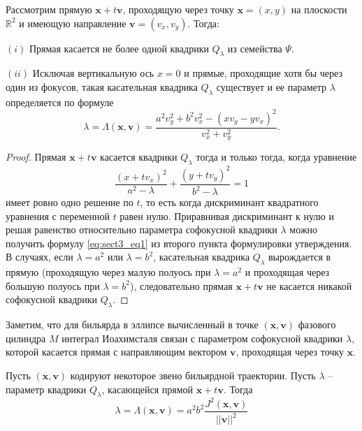\begin{statement}
Рассмотрим прямую $\mathbf{x}+t\mathbf{v}$, проходящую через точку $\mathbf{x}= (x, y)$ на плоскости $\mathbb{R}^2$ и имеющую направление $\mathbf{v}=(v_x, v_y)$. Тогда:

$(i)$ Прямая касается не более одной квадрики $Q_\lambda$ из семейства $\Psi$.

$(ii)$ Исключая вертикальную ось $x=0$ и прямые, проходящие хотя бы через один из фокусов,  такая касательная квадрика  $Q_\lambda$ существует и ее параметр $\lambda$ определяется по формуле 
\begin{equation}
\lambda = \Lambda(\mathbf{x}, \mathbf{v}) = \frac{a^2 v_y^2 + b^2v_x^2 - (x v_y-y v_x)^2}{v_x^2 + v_y^2}.
\label{eq:sect3_eq1}
\end{equation}

\end{statement}

\begin{proof}
Прямая $\mathbf{x} + t \mathbf{v}$ касается квадрики $Q_\lambda$ тогда и только тогда, когда уравнение
$$\frac{(x + t v_x)^2}{a^2-\lambda} + \frac{(y + t v_y)^2}{b^2-\lambda} = 1$$
имеет ровно одно решение по $t$, то есть когда дискриминант квадратного уравнения с переменной $t$  равен нулю. Приравнивая дискриминант к нулю и решая равенство относительно параметра софокусной квадрики $\lambda$ можно получить формулу \eqref{eq:sect3_eq1} из второго пункта формулировки утверждения. В случаях, если $\lambda = a^2$ или $\lambda = b^2$, касательная квадрика $Q_\lambda$ вырождается в прямую (проходящую через малую полуось при $\lambda = a^2$ и проходящая через большую полуось при $\lambda = b^2$), следовательно прямая $\mathbf{x}+ t\mathbf{v}$ не касается никакой софокусной квадрики $Q_\lambda$.
\end{proof}

Заметим, что для бильярда в эллипсе вычисленный в точке $(\mathbf{x}, \mathbf{v})$ фазового цилиндра $M$ интеграл Иоахимсталя связан с параметром софокусной квадрики $\lambda$, которой касается прямая с направляющим вектором $\mathbf{v}$, проходящая через точку $\mathbf{x}$.

\begin{statement}
    Пусть $(\mathbf{x}, \mathbf{v})$ кодируют некоторое звено бильярдной траектории. Пусть $\lambda$ -- параметр квадрики $Q_\lambda$, касающейся прямой $\mathbf{x} +t \mathbf{v}$. Тогда 
    \begin{equation}
        \lambda = \Lambda(\mathbf{x}, \mathbf{v}) =  a^2 b^2 \frac{J^2(\mathbf{x}, \mathbf{v})}{||\mathbf{v}||^2}
    \label{eq:sect3_eq2}
    \end{equation}
\end{statement}

